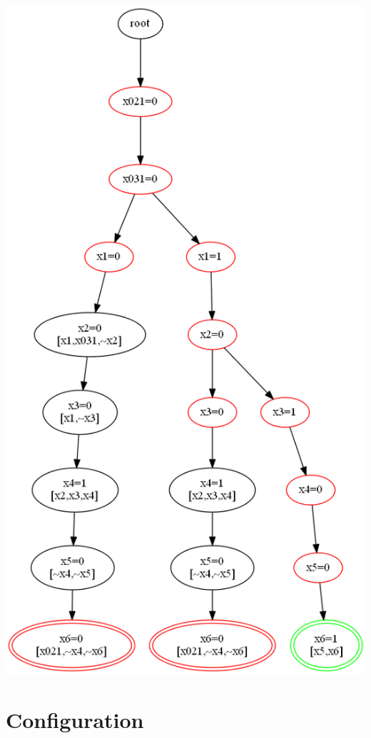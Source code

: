 \documentclass[11pt]{article}
\begin{document}
\begin{center}
\includegraphics[keepaspectratio=true,height=.7\textheight]{tree1-color}
\end{center}

\vfill
\mbox{}

\newpage

\section{Configuration}
\end{document}
